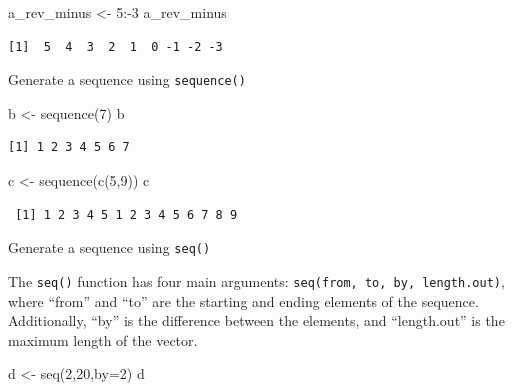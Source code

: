 \documentclass[
  letterpaper,
  DIV=11,
  numbers=noendperiod]{scrreprt}
\newenvironment{Shaded}{\begin{snugshade}}{\end{snugshade}}
\newcommand{\AttributeTok}[1]{\textcolor[rgb]{0.40,0.45,0.13}{#1}}
\newcommand{\DecValTok}[1]{\textcolor[rgb]{0.68,0.00,0.00}{#1}}
\newcommand{\FunctionTok}[1]{\textcolor[rgb]{0.28,0.35,0.67}{#1}}
\newcommand{\NormalTok}[1]{\textcolor[rgb]{0.00,0.23,0.31}{#1}}
\newcommand{\OtherTok}[1]{\textcolor[rgb]{0.00,0.23,0.31}{#1}}
\newcommand{\SpecialCharTok}[1]{\textcolor[rgb]{0.37,0.37,0.37}{#1}}
\begin{document}
\begin{Shaded}
\begin{Highlighting}[]
\NormalTok{a\_rev\_minus }\OtherTok{\textless{}{-}} \DecValTok{5}\SpecialCharTok{:{-}}\DecValTok{3}
\NormalTok{a\_rev\_minus}
\end{Highlighting}
\end{Shaded}

\begin{verbatim}
[1]  5  4  3  2  1  0 -1 -2 -3
\end{verbatim}

Generate a sequence using \texttt{sequence()}

\begin{Shaded}
\begin{Highlighting}[]
\NormalTok{b }\OtherTok{\textless{}{-}} \FunctionTok{sequence}\NormalTok{(}\DecValTok{7}\NormalTok{)}
\NormalTok{b}
\end{Highlighting}
\end{Shaded}

\begin{verbatim}
[1] 1 2 3 4 5 6 7
\end{verbatim}

\begin{Shaded}
\begin{Highlighting}[]
\NormalTok{c }\OtherTok{\textless{}{-}} \FunctionTok{sequence}\NormalTok{(}\FunctionTok{c}\NormalTok{(}\DecValTok{5}\NormalTok{,}\DecValTok{9}\NormalTok{))}
\NormalTok{c}
\end{Highlighting}
\end{Shaded}

\begin{verbatim}
 [1] 1 2 3 4 5 1 2 3 4 5 6 7 8 9
\end{verbatim}

Generate a sequence using \texttt{seq()}

The \texttt{seq()} function has four main arguments:
\texttt{seq(from,\ to,\ by,\ length.out)}, where ``from'' and ``to'' are
the starting and ending elements of the sequence. Additionally, ``by''
is the difference between the elements, and ``length.out'' is the
maximum length of the vector.

\begin{Shaded}
\begin{Highlighting}[]
\NormalTok{d }\OtherTok{\textless{}{-}} \FunctionTok{seq}\NormalTok{(}\DecValTok{2}\NormalTok{,}\DecValTok{20}\NormalTok{,}\AttributeTok{by=}\DecValTok{2}\NormalTok{)}
\NormalTok{d}
\end{Highlighting}
\end{Shaded}
\end{document}
